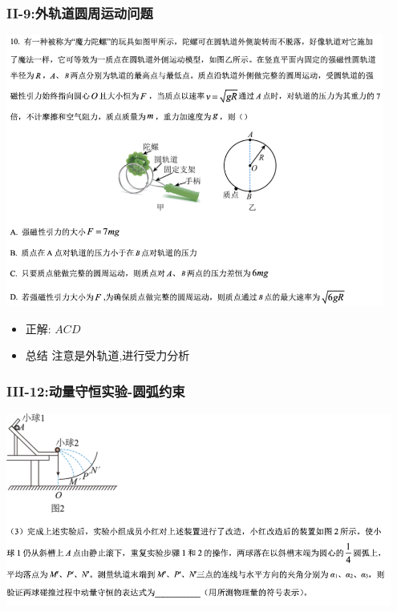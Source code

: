 \documentclass{article}
\begin{document}
\vspace{2em}

\subsubsection{II-9:外轨道圆周运动问题}

\includegraphics[width=0.93\textwidth,keepaspectratio]{./pictures/1.2-7.png}

\begin{itemize}
    \item 正解: $ACD$
    \item 总结 注意是外轨道,进行受力分析
\end{itemize}


\vspace{2em}

\subsubsection{III-12:动量守恒实验-圆弧约束}
\includegraphics[width=0.95\textwidth,keepaspectratio]{./pictures/1.2-4.png}
\end{document}
